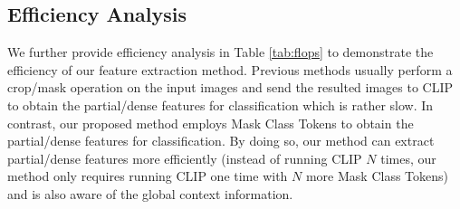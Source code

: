 \documentclass{article}
\theoremstyle{plain}
\theoremstyle{definition}
\theoremstyle{remark}
\begin{document}
\begin{table}[H]
\begin{center}
\caption{ \small \textbf{Results on open-vocabulary instance segmentation under the COCO split setting.}}
\label{tab:cocosplit}
\end{center}
\end{table}

\subsection{Efficiency Analysis}

We further provide efficiency analysis in Table \ref{tab:flops} to demonstrate the efficiency of our feature extraction method. Previous methods usually perform a crop/mask operation on the input images and send the resulted images to CLIP to obtain the partial/dense features for classification which is rather slow. In contrast, our proposed method employs Mask Class Tokens to obtain the partial/dense features for classification. By doing so, our method can extract partial/dense features more efficiently (instead of running CLIP $N$ times, our method only requires running CLIP one time with $N$ more Mask Class Tokens) and is also aware of the global context information.


\begin{table}[H]
\centering
\caption{\textbf{FLOPs Comparison.} We use the CLIP ViT-L/14 model in all methods for fair comparison and 640x640 as the input resolution.}
\label{tab:flops}
\end{table}
\end{document}
